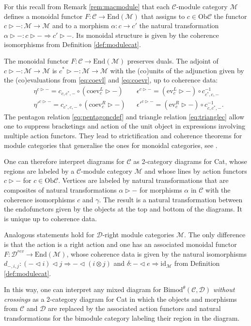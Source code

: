 \documentclass[1.5pt, a4paper]{article}
\newcommand{\mac}{\mathcal C}
\newcommand{\mad}{\mathcal D}
\newcommand{\mam}{\mathcal M}
\newcommand{\End}{\mathrm{End}}
\newcommand{\Ob}{\mathrm{Ob}}
\newcommand{\Bimod}{\mathrm{Bimod}}
\newcommand{\ev}{\mathrm{ev}}
\newcommand{\coev}{\mathrm{coev}}
\newcommand{\inv}[0]{{-1}}
\newcommand{\oo}[0]{\otimes}
\newcommand{\id}[0]{\mathrm{id}}
\begin{document}
For this recall from Remark \ref{rem:macmodule} that each $\mac$-module category $\mam$ defines a monoidal functor $F:\mac \to \End(\mam)$ that assigns to  $c\in \Ob\mac $  the   functor $c\rhd-:\mam\to \mam$ and to a morphism $\alpha: c\to c'$ the  natural transformation $\alpha\rhd-:c\rhd-\Rightarrow c'\rhd-$. Its monoidal structure  is given by the 
coherence isomorphisms  from Definition \ref{def:modulecat}. 

The monoidal functor $F:\mac\to \End(\mam)$  preserves duals.
The adjoint of  $c\rhd -:\mam\to\mam$ is  $c^*\rhd-:\mam\to \mam$  with the (co)units  of the adjunction given by the  (co)evaluations  from \eqref{eq:coevl} and \eqref{eq:coevr}, up to coherence data:
\begin{align*}
&\eta^{c\rhd -}=c_{c,c^*,-}\circ (\coev^L_c\rhd -)
& &\epsilon^{c\rhd -}=(\ev^L_c\rhd -)\circ c^\inv_{c^*,c,-}
\\
&\eta'^{c\rhd -}= c_{c^*,c,-} \circ (\coev^R_c\rhd -)
& &\epsilon'^{c\rhd-}=(\mathrm{ev}^R_{c}\rhd -)\circ c^\inv_{c,c^*,-}.
\end{align*}
The  pentagon relation \eqref{eq:pentagoncdef}   and triangle relation \eqref{eq:trianglec} allow one to suppress bracketings and action of the unit object in expressions involving multiple action functors. They lead to  strictification and coherence theorems for module categories that generalise the ones for monoidal categories, see  \cite[Rem.~7.2.4]{EGNO}. 



One can therefore interpret diagrams for $\mac$  as  2-category diagrams for Cat, whose regions are labeled by a $\mac$-module category $\mam$ and whose lines by action functors $c\rhd -$ for $c\in \Ob\mac$. Vertices are labeled by natural transformations that are composites of natural transformations  $\alpha\rhd -$ for morphisms $\alpha$ in $\mac$   with the coherence isomorphisms $c$ and $\gamma$.
The result is a natural transformation between the endofunctors given by the objects at the top and bottom of the diagrams. It is  unique up to coherence data.


Analogous statements hold for $\mad$-right module categories $\mam$. The only difference is that the action is a right action and one has an associated monoidal functor $F:\mad^{rev}\to \End(\mam)$, whose coherence data is given by the natural isomorphisms $d_{-,i,j}: (-\lhd i)\lhd j\Rightarrow -\lhd(i\oo j)$ and  $\delta: -\lhd  e \Rightarrow \id_\mam$  from Definition \ref{def:modulecat}.

In this way, one can  interpret any mixed diagram for $\Bimod^\theta(\mac,\mad)$ \emph{without crossings} as a 2-category diagram  for Cat in which the objects and morphisms from $\mac$ and $\mad$ are replaced by the associated action functors and natural transformations for the bimodule category labeling their region in the diagram. 
\end{document}
